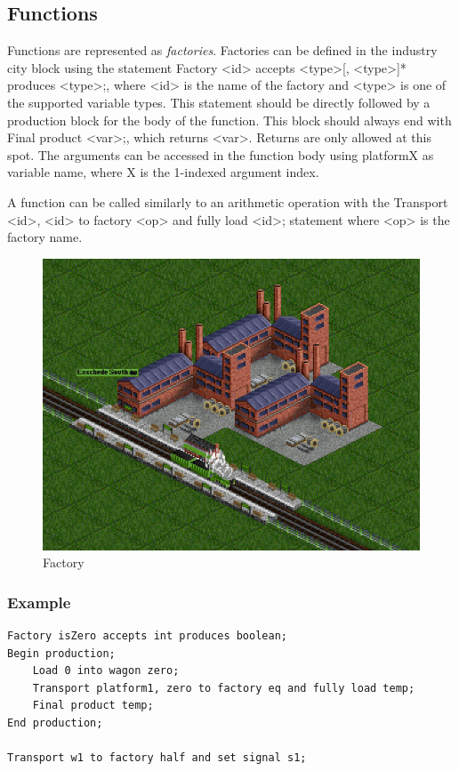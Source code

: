 \documentclass[10pt,a4paper]{article}
\newcommand{\code}[1]{{\ttfamily\small #1}}
\begin{document}
\subsection{Functions}

Functions are represented as \emph{factories}. Factories can be defined in the \code{industry} city block using the statement \code{Factory <id> accepts <type>[, <type>]* produces <type>;}, where \code{<id>} is the name of the factory and \code{<type>} is one of the supported variable types. This statement should be directly followed by a \code{production} block for the body of the function. This block should always end with \code{Final product <var>;}, which returns \code{<var>}. Returns are only allowed at this spot. The arguments can be accessed in the function body using \code{platformX} as variable name, where \code{X} is the 1-indexed argument index.

A function can be called similarly to an arithmetic operation with the \code{Transport <id>, <id> to factory <op> and fully load <id>;} statement where \code{<op>} is the factory name.

\begin{figure}[t]
\centering
\includegraphics[scale=0.25]{Images/factory}
\caption{Factory}
\label{fig:factory}
\end{figure}

\subsubsection*{Example}

\begin{lstlisting}
Factory isZero accepts int produces boolean;
Begin production;
	Load 0 into wagon zero;
	Transport platform1, zero to factory eq and fully load temp;
	Final product temp;
End production;

Transport w1 to factory half and set signal s1;
\end{lstlisting}
\end{document}
